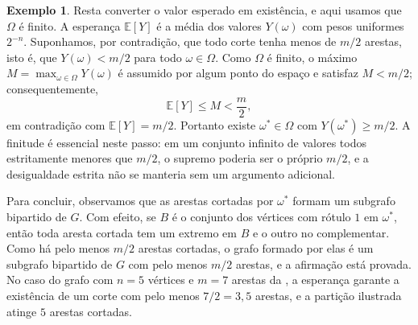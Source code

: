\documentclass[12pt,portuguese]{article}
\theoremstyle{definition}
\newtheorem{example}[example]{Exemplo}
\begin{document}
\begin{example}
Resta converter o valor esperado em existência, e aqui usamos que $\Omega$ é
finito. A esperança $\mathbb{E}[Y]$ é a média dos valores $Y(\omega)$ com
pesos uniformes $2^{-n}$. Suponhamos, por contradição, que todo corte tenha
menos de $m/2$ arestas, isto é, que $Y(\omega)<m/2$ para todo
$\omega\in\Omega$. Como $\Omega$ é finito, o máximo
$M=\max_{\omega\in\Omega}Y(\omega)$ é assumido por algum ponto do espaço e
satisfaz $M<m/2$; consequentemente,
\[
\mathbb{E}[Y]\leqslant M<\frac{m}{2},
\]
em contradição com $\mathbb{E}[Y]=m/2$. Portanto existe $\omega^*\in\Omega$
com $Y(\omega^*)\geqslant m/2$. A finitude é essencial neste passo: em um
conjunto infinito de valores todos estritamente menores que $m/2$, o supremo
poderia ser o próprio $m/2$, e a desigualdade estrita não se manteria sem um
argumento adicional.

Para concluir, observamos que as arestas cortadas por $\omega^*$ formam um
subgrafo bipartido de $G$. Com efeito, se $B$ é o conjunto dos vértices com
rótulo $1$ em $\omega^*$, então toda aresta cortada tem um extremo em $B$ e o
outro no complementar. Como há pelo menos $m/2$ arestas cortadas, o grafo
formado por elas é um subgrafo bipartido de $G$ com pelo menos $m/2$ arestas,
e a afirmação está provada. No caso do grafo com $n=5$ vértices e $m=7$ arestas
da , a esperança garante a existência de um corte com pelo
menos $7/2=3{,}5$ arestas, e a partição ilustrada atinge $5$ arestas cortadas.
\end{example}
\end{document}
